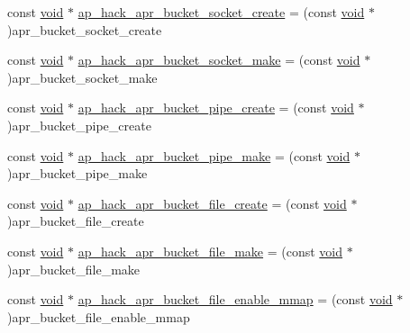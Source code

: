 \begin{DoxyCompactItemize}
\item 
const \hyperlink{group__MOD__ISAPI_gacd6cdbf73df3d9eed42fa493d9b621a6}{void} $\ast$ \hyperlink{srclib_2apr-util_2exports_8c_a7261ddc4206dae8e27e3ba3aeebcc740}{ap\+\_\+hack\+\_\+apr\+\_\+bucket\+\_\+socket\+\_\+create} = (const \hyperlink{group__MOD__ISAPI_gacd6cdbf73df3d9eed42fa493d9b621a6}{void} $\ast$)apr\+\_\+bucket\+\_\+socket\+\_\+create
\item 
const \hyperlink{group__MOD__ISAPI_gacd6cdbf73df3d9eed42fa493d9b621a6}{void} $\ast$ \hyperlink{srclib_2apr-util_2exports_8c_a5d7bc6c46d8143a240c50742b636e2d1}{ap\+\_\+hack\+\_\+apr\+\_\+bucket\+\_\+socket\+\_\+make} = (const \hyperlink{group__MOD__ISAPI_gacd6cdbf73df3d9eed42fa493d9b621a6}{void} $\ast$)apr\+\_\+bucket\+\_\+socket\+\_\+make
\item 
const \hyperlink{group__MOD__ISAPI_gacd6cdbf73df3d9eed42fa493d9b621a6}{void} $\ast$ \hyperlink{srclib_2apr-util_2exports_8c_a7798a2963f84ebfbaf25848f8ed497cf}{ap\+\_\+hack\+\_\+apr\+\_\+bucket\+\_\+pipe\+\_\+create} = (const \hyperlink{group__MOD__ISAPI_gacd6cdbf73df3d9eed42fa493d9b621a6}{void} $\ast$)apr\+\_\+bucket\+\_\+pipe\+\_\+create
\item 
const \hyperlink{group__MOD__ISAPI_gacd6cdbf73df3d9eed42fa493d9b621a6}{void} $\ast$ \hyperlink{srclib_2apr-util_2exports_8c_accd380f03dd7d48004cb0def02fe13f9}{ap\+\_\+hack\+\_\+apr\+\_\+bucket\+\_\+pipe\+\_\+make} = (const \hyperlink{group__MOD__ISAPI_gacd6cdbf73df3d9eed42fa493d9b621a6}{void} $\ast$)apr\+\_\+bucket\+\_\+pipe\+\_\+make
\item 
const \hyperlink{group__MOD__ISAPI_gacd6cdbf73df3d9eed42fa493d9b621a6}{void} $\ast$ \hyperlink{srclib_2apr-util_2exports_8c_a2db8bc0c3e47eb3f9f6cbeaeb6f29ac4}{ap\+\_\+hack\+\_\+apr\+\_\+bucket\+\_\+file\+\_\+create} = (const \hyperlink{group__MOD__ISAPI_gacd6cdbf73df3d9eed42fa493d9b621a6}{void} $\ast$)apr\+\_\+bucket\+\_\+file\+\_\+create
\item 
const \hyperlink{group__MOD__ISAPI_gacd6cdbf73df3d9eed42fa493d9b621a6}{void} $\ast$ \hyperlink{srclib_2apr-util_2exports_8c_a5a0bf0ff4c7afaca3c474681ae385a59}{ap\+\_\+hack\+\_\+apr\+\_\+bucket\+\_\+file\+\_\+make} = (const \hyperlink{group__MOD__ISAPI_gacd6cdbf73df3d9eed42fa493d9b621a6}{void} $\ast$)apr\+\_\+bucket\+\_\+file\+\_\+make
\item 
const \hyperlink{group__MOD__ISAPI_gacd6cdbf73df3d9eed42fa493d9b621a6}{void} $\ast$ \hyperlink{srclib_2apr-util_2exports_8c_a56e30beb8acaa8493906c9a186a56b78}{ap\+\_\+hack\+\_\+apr\+\_\+bucket\+\_\+file\+\_\+enable\+\_\+mmap} = (const \hyperlink{group__MOD__ISAPI_gacd6cdbf73df3d9eed42fa493d9b621a6}{void} $\ast$)apr\+\_\+bucket\+\_\+file\+\_\+enable\+\_\+mmap

\end{DoxyCompactItemize}
